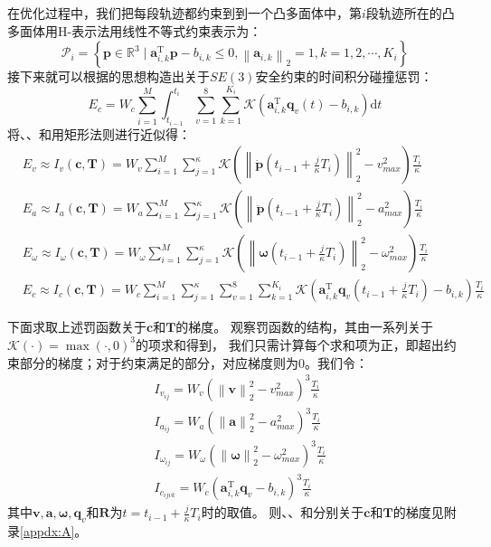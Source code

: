 在优化过程中，我们把每段轨迹都约束到到一个凸多面体中，第$i$段轨迹所在的凸多面体用H-表示法用线性不等式约束表示为：
\begin{equation}
  \mathcal{P}_i = 
  \left\{
      \bm{p} \in \mathbb{R}^3 \mid \bm{a}_{i,k}^{\text{T}}\bm{p}-b_{i,k} \leq 0, \left\| \bm{a}_{i,k} \right\|_2=1, k=1,2,\cdots,K_i
  \right\}
  \label{equ:ith_piece_s_polyhedron}
\end{equation}
接下来就可以根据\cite{yang2021whole}的思想构造出关于$SE(3)$安全约束的时间积分碰撞惩罚：
\begin{equation}
  E_c = W_c  \sum_{i=1}^M \int_{t_{i-1}}^{t_i} \sum_{v=1}^8 \sum_{k=1}^{K_i} \mathcal{K}(\bm{a}_{i,k}^{\text{T}}\bm{q}_v(t) - b_{i,k}) \mathrm{d}t 
  \label{equ:collision_penalty}
\end{equation}
将、、和用矩形法则进行近似得：
\begin{align}
  &E_v \approx I_v(\bm{c}, \bm{T}) = W_v \sum_{i=1}^M \sum_{j=1}^{\kappa} \mathcal{K}(\left\|\dot{\bm{p}}(t_{i-1}+\frac{j}{\kappa}T_i)\right\|_2^2 - v_{max}^2)\frac{T_i}{\kappa}
  \label{equ:velocity_penalty_approx}\\
  &E_a \approx I_a(\bm{c}, \bm{T}) = W_a \sum_{i=1}^M \sum_{j=1}^{\kappa} \mathcal{K}(\left\|\ddot{\bm{p}}(t_{i-1}+\frac{j}{\kappa}T_i)\right\|_2^2 - a_{max}^2)\frac{T_i}{\kappa}
  \label{equ:acceleration_penalty_approx}\\
  &E_{\omega} \approx I_{\omega}(\bm{c}, \bm{T}) = W_{\omega} \sum_{i=1}^M \sum_{j=1}^{\kappa} \mathcal{K}(\left\|\bm{\omega}(t_{i-1}+\frac{j}{\kappa}T_i)\right\|_2^2 - {\omega}_{max}^2)\frac{T_i}{\kappa}
  \label{equ:acceleration_penalty_approx}\\
  &E_c \approx I_c(\bm{c}, \bm{T}) = W_c  \sum_{i=1}^M \sum_{j=1}^{\kappa} \sum_{v=1}^8 \sum_{k=1}^{K_i} \mathcal{K}(\bm{a}_{i,k}^{\text{T}}\bm{q}_v(t_{i-1}+\frac{j}{\kappa}T_i) - b_{i,k})\frac{T_i}{\kappa}
  \label{equ:collision_penalty_approx}
\end{align}

下面求取上述罚函数关于$\bm{c}$和$\bm{T}$的梯度。
观察罚函数的结构，其由一系列关于$\mathcal{K}(\cdot) = \max(\cdot, 0)^3$的项求和得到，
我们只需计算每个求和项为正，即超出约束部分的梯度；对于约束满足的部分，对应梯度则为0。我们令：
\begin{align}
  & I_{v_{ij}} = W_v (\left\|\bm{v}\right\|_2^2 - v_{max}^2)^3\frac{T_i}{\kappa}
  \label{equ:Evij}\\
  & I_{a_{ij}} = W_a (\left\|\bm{a}\right\|_2^2 - a_{max}^2)^3\frac{T_i}{\kappa}
  \label{equ:Eaij}\\
  & I_{\omega_{ij}} = W_{\omega} (\left\|\bm{\omega}\right\|_2^2 - \omega_{max}^2)^3\frac{T_i}{\kappa}
  \label{equ:Eoij}\\
  & I_{c_{ijvk}} = W_c(\bm{a}_{i,k}^{\text{T}}\bm{q}_v - b_{i,k})^3\frac{T_i}{\kappa}
  \label{equ:Ecijvk}
\end{align}
其中$\bm{v},\bm{a},\bm{\omega},\bm{q}_v$和$\bm{R}$为$t=t_{i-1}+\frac{j}{\kappa}T_i$时的取值。
则、、和分别关于$\bm{c}$和$\bm{T}$的梯度见附录\ref{appdx:A}。

